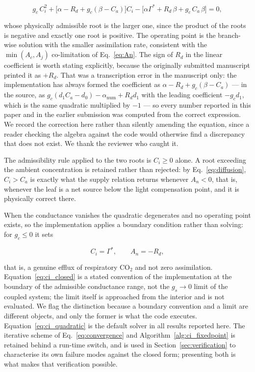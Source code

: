 \documentclass[a4paper,fleqn]{cas-sc}
\begin{document}
\begin{equation}
g_c\,C_i^{2}
+ \bigl[\alpha - R_d + g_c(\beta - C_a)\bigr] C_i
- \bigl[\alpha\Gamma^{*} + R_d\,\beta + g_c\,C_a\,\beta\bigr] = 0,
\label{eq:ci_quadratic}
\end{equation}

whose physically admissible root is the larger one, since the product of the
roots is negative and exactly one root is positive. The operating point is
the branch-wise solution with the smaller assimilation rate, consistent with
the $\min(A_c,A_j)$ co-limitation of Eq.~\eqref{eq:An}. The sign of $R_d$ in
the linear coefficient is worth stating explicitly, because the originally
submitted manuscript printed it as $+R_d$. That was a transcription error in
the manuscript only: the implementation has always formed the coefficient as
$\alpha - R_d + g_c(\beta - C_a)$ --- in the source, as
$g_c(d_1C_a-d_0)-\alpha_{\text{num}}+R_d d_1$ with the leading coefficient
$-g_c d_1$, which is the same quadratic multiplied by $-1$ --- so every
number reported in this paper and in the earlier submission was computed from
the correct expression. We record the correction here rather than silently
amending the equation, since a reader checking the algebra against the code
would otherwise find a discrepancy that does not exist. We thank the reviewer
who caught it.

The admissibility rule applied to the two roots is $C_i \ge 0$ alone. A root
exceeding the ambient concentration is retained rather than rejected: by
Eq.~\eqref{eq:diffusion}, $C_i > C_a$ is exactly what the supply relation
returns whenever $A_n < 0$, that is, whenever the leaf is a net source below
the light compensation point, and it is physically correct there.

When the conductance vanishes the quadratic degenerates and no operating
point exists, so the implementation applies a boundary condition rather than
solving: for $g_c \le 0$ it sets

\begin{equation}
C_i = \Gamma^{*},
\qquad
A_n = -R_d,
\label{eq:ci_closed}
\end{equation}

that is, a genuine efflux of respiratory CO$_2$ and not zero assimilation.
Equation~\eqref{eq:ci_closed} is a stated convention of the implementation at
the boundary of the admissible conductance range, not the $g_s \to 0$ limit of
the coupled system; the limit itself is approached from the interior and is
not evaluated. We flag the distinction because a boundary convention and a
limit are different objects, and only the former is what the code executes.
Equation~\eqref{eq:ci_quadratic} is the default solver in all results
reported here. The iterative scheme of Eq.~\eqref{eq:convergence} and
Algorithm~\ref{alg:ci_fixedpoint} is retained behind a run-time switch, and
is used in Section~\ref{sec:verification} to characterise its own failure
modes against the closed form; presenting both is what makes that
verification possible.
\end{document}
